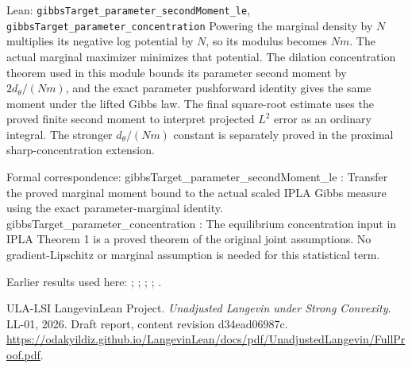 \documentclass[11pt,a4paper]{article}
\begin{document}
\begin{leanbox}{Lean: \texttt{gibbsTarget\_\allowbreak{}parameter\_\allowbreak{}secondMoment\_\allowbreak{}le}, \texttt{gibbsTarget\_\allowbreak{}parameter\_\allowbreak{}concentration}}
Powering the marginal density by \(N\) multiplies its negative log potential by \(N\), so its modulus becomes \(Nm\). The actual marginal maximizer minimizes that potential. The dilation concentration theorem used in this module bounds its parameter second moment by \(2d_\theta/(Nm)\), and the exact parameter pushforward identity gives the same moment under the lifted Gibbs law. The final square-root estimate uses the proved finite second moment to interpret projected \(L^2\) error as an ordinary integral. The stronger \(d_\theta/(Nm)\) constant is separately proved in the proximal sharp-concentration extension.



Formal correspondence: gibbsTarget\_parameter\_secondMoment\_le : Transfer the proved marginal moment bound to the actual scaled IPLA Gibbs measure using the exact parameter-marginal identity. gibbsTarget\_parameter\_concentration : The equilibrium concentration input in IPLA Theorem 1 is a proved theorem of the original joint assumptions. No gradient-Lipschitz or marginal assumption is needed for this statistical term.
\end{leanbox}


Earlier results used here: \cite[Section~3.26.13]{LangevinLean2026ULASC}; \cite[Section~3.26.15]{LangevinLean2026ULASC}; \cite[Section~3.26.3]{LangevinLean2026ULASC}; \cite[Section~3.48.1]{LangevinLean2026ULASC}; \cite[Section~3.48.8]{LangevinLean2026ULASC}.

\begin{thebibliography}{ULA-LSI}
LangevinLean Project. \emph{Unadjusted Langevin under Strong Convexity}. LL-01, 2026. Draft report, content revision d34ead06987c. \url{https://odakyildiz.github.io/LangevinLean/docs/pdf/UnadjustedLangevin/FullProof.pdf}.
\end{thebibliography}
\end{document}
